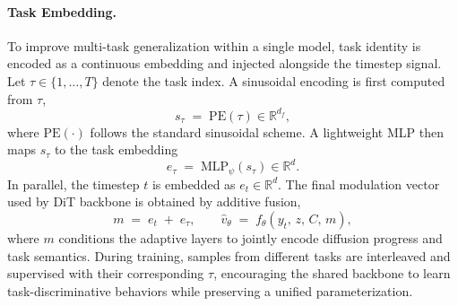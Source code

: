 \paragraph{Task Embedding.}
To improve multi-task generalization within a single model, task identity is encoded as a continuous embedding and injected alongside the timestep signal.
%
Let $\tau\in\{1,\dots,T\}$ denote the task index.
%
A sinusoidal encoding is first computed from $\tau$,
\begin{equation}
s_{\tau} \;=\; \mathrm{PE}(\tau)\in\mathbb{R}^{d_f},
\end{equation}
where $\mathrm{PE}(\cdot)$ follows the standard sinusoidal scheme.
%
A lightweight MLP then maps $s_{\tau}$ to the task embedding
\begin{equation}
e_{\tau} \;=\; \mathrm{MLP}_{\psi}(s_{\tau}) \in \mathbb{R}^{d}.
\end{equation}
In parallel, the timestep $t$ is embedded as $e_t\in\mathbb{R}^{d}$.
The final modulation vector used by DiT backbone is obtained by additive fusion,
\begin{equation}
m \;=\; e_t \;+\; e_{\tau},
\qquad
\hat{v}_{\theta} \;=\; f_{\theta}\!\left(y_t,\, z,\, C,\, m\right),
\end{equation}
where $m$ conditions the adaptive layers to jointly encode diffusion progress and task semantics.
%
During training, samples from different tasks are interleaved and supervised with their corresponding $\tau$, 
encouraging the shared backbone to learn task-discriminative behaviors while preserving a unified parameterization.










